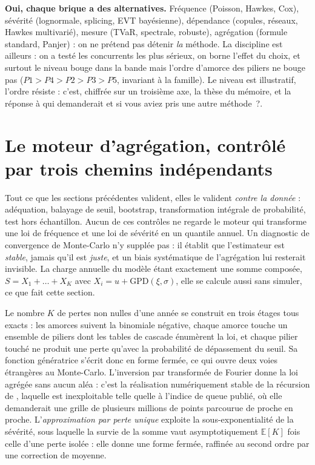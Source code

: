 \begin{cle}
\textbf{Oui, chaque brique a des alternatives.} Fréquence (Poisson, Hawkes, Cox), sévérité
(lognormale, splicing, EVT bayésienne), dépendance (copules, réseaux, Hawkes multivarié),
mesure (TVaR, spectrale, robuste), agrégation (formule standard, Panjer) : on ne prétend pas
détenir \emph{la} méthode. La discipline est ailleurs : on a testé les concurrents les plus
sérieux, on borne l'effet du choix, et surtout le niveau bouge dans la bande mais
l'ordre d'amorce des piliers ne bouge pas ($P1>P4>P2>P3>P5$, invariant à la famille).
Le niveau est illustratif, l'ordre résiste : c'est, chiffrée sur un troisième axe, la thèse du
mémoire, et la réponse à qui demanderait \og et si vous aviez pris une autre méthode~?\fg.
\end{cle}

\section{Le moteur d'agrégation, contrôlé par trois chemins indépendants}
\label{sec:triangulation-agregation}

Tout ce que les sections précédentes valident, elles le valident \emph{contre la donnée} :
adéquation, balayage de seuil, bootstrap, transformation intégrale de probabilité, test hors
échantillon. Aucun de ces contrôles ne regarde le moteur qui transforme une loi de fréquence et
une loi de sévérité en un quantile annuel. Un diagnostic de convergence de Monte-Carlo n'y
supplée pas : il établit que l'estimateur est \emph{stable}, jamais qu'il est \emph{juste}, et un
biais systématique de l'agrégation lui resterait invisible. La charge annuelle du modèle étant
exactement une somme composée, $S=X_1+\dots+X_K$ avec $X_i = u + \mathrm{GPD}(\xi,\sigma)$, elle
se calcule aussi sans simuler, ce que fait cette section.

Le nombre $K$ de pertes non nulles d'une année se construit en trois étages tous exacts : les
amorces suivent la binomiale négative, chaque amorce touche un ensemble de piliers dont les
tables de cascade énumèrent la loi, et chaque pilier touché ne produit une perte qu'avec la
probabilité de dépassement du seuil. Sa fonction génératrice s'écrit donc en forme fermée, ce qui
ouvre deux voies étrangères au Monte-Carlo. L'inversion par transformée de Fourier donne
la loi agrégée sans aucun aléa : c'est la réalisation numériquement stable de la récursion de
\citet{panjer1981} \citep{embrechtsfrei2009}, laquelle est inexploitable telle quelle à l'indice de
queue publié, où elle demanderait une grille de plusieurs millions de points parcourue de proche en
proche. L'\emph{approximation par perte unique} \citep{bockerkluppelberg2005} exploite la sous-exponentialité de la sévérité, sous laquelle la survie de la somme vaut
asymptotiquement $\mathbb{E}[K]$ fois celle d'une perte isolée : elle donne une forme fermée,
raffinée au second ordre par une correction de moyenne.

